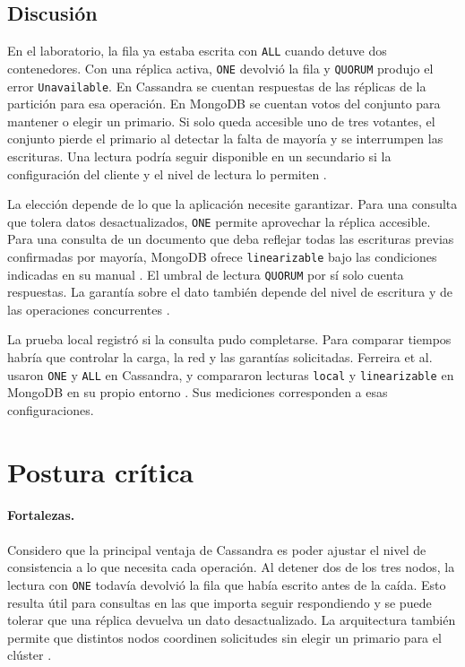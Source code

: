 \documentclass[11pt,a4paper]{article}
\begin{document}
\subsection{Discusión}
En el laboratorio, la fila ya estaba escrita con \texttt{ALL} cuando detuve dos contenedores. Con una réplica activa, \texttt{ONE} devolvió la fila y \texttt{QUORUM} produjo el error \texttt{Unavailable}. En Cassandra se cuentan respuestas de las réplicas de la partición para esa operación. En MongoDB se cuentan votos del conjunto para mantener o elegir un primario. Si solo queda accesible uno de tres votantes, el conjunto pierde el primario al detectar la falta de mayoría y se interrumpen las escrituras. Una lectura podría seguir disponible en un secundario si la configuración del cliente y el nivel de lectura lo permiten \cite{mongodb8replication,mongodb8elections}.

La elección depende de lo que la aplicación necesite garantizar. Para una consulta que tolera datos desactualizados, \texttt{ONE} permite aprovechar la réplica accesible. Para una consulta de un documento que deba reflejar todas las escrituras previas confirmadas por mayoría, MongoDB ofrece \texttt{linearizable} bajo las condiciones indicadas en su manual \cite{mongodb8linearizable}. El umbral de lectura \texttt{QUORUM} por sí solo cuenta respuestas. La garantía sobre el dato también depende del nivel de escritura y de las operaciones concurrentes \cite{cassandra5dynamo}.

La prueba local registró si la consulta pudo completarse. Para comparar tiempos habría que controlar la carga, la red y las garantías solicitadas. Ferreira et al. usaron \texttt{ONE} y \texttt{ALL} en Cassandra, y compararon lecturas \texttt{local} y \texttt{linearizable} en MongoDB en su propio entorno \cite[sección \enquote{Database configurations}]{ferreira2024cloud}. Sus mediciones corresponden a esas configuraciones.

\section{Postura crítica}
\paragraph{Fortalezas.} Considero que la principal ventaja de Cassandra es poder ajustar el nivel de consistencia a lo que necesita cada operación. Al detener dos de los tres nodos, la lectura con \texttt{ONE} todavía devolvió la fila que había escrito antes de la caída. Esto resulta útil para consultas en las que importa seguir respondiendo y se puede tolerar que una réplica devuelva un dato desactualizado. La arquitectura también permite que distintos nodos coordinen solicitudes sin elegir un primario para el clúster \cite{cassandra5dynamo}.
\end{document}
